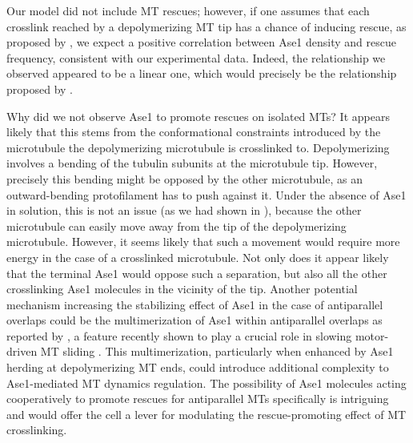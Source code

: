 Our model did not include MT rescues; however, if one assumes that each crosslink reached by a depolymerizing MT tip has a chance of inducing rescue, as proposed by \cite{Stoppin-Mellet2013}, we expect a positive correlation between Ase1 density and rescue frequency, consistent with our experimental data. Indeed, the relationship we observed appeared to be a linear one, which would precisely be the relationship proposed by \cite{Stoppin-Mellet2013}.\par 

Why did we not observe Ase1 to promote rescues on isolated MTs? It appears likely that this stems from the conformational constraints introduced by the microtubule the depolymerizing microtubule is crosslinked to. Depolymerizing involves a bending of the tubulin subunits at the microtubule tip. However, precisely this bending might be opposed by the other microtubule, as an outward-bending protofilament has to push against it. Under the absence of Ase1 in solution, this is not an issue (as we had shown in ), because the other microtubule can easily move away from the tip of the depolymerizing microtubule. However, it seems likely that such a movement would require more energy in the case of a crosslinked microtubule. Not only does it appear likely that the terminal Ase1 would oppose such a separation, but also all the other crosslinking Ase1 molecules in the vicinity of the tip. Another potential mechanism increasing the stabilizing effect of Ase1 in the case of antiparallel overlaps could be the multimerization of Ase1 within antiparallel overlaps as reported by \cite{Kapitein2008}, a feature recently shown to play a crucial role in slowing motor-driven MT sliding \parencite{alfieri2021two}. This multimerization, particularly when enhanced by Ase1 herding at depolymerizing MT ends, could introduce additional complexity to Ase1-mediated MT dynamics regulation. The possibility of Ase1 molecules acting cooperatively to promote rescues for antiparallel MTs specifically is intriguing and would offer the cell a lever for modulating the rescue-promoting effect of MT crosslinking. \par
 
